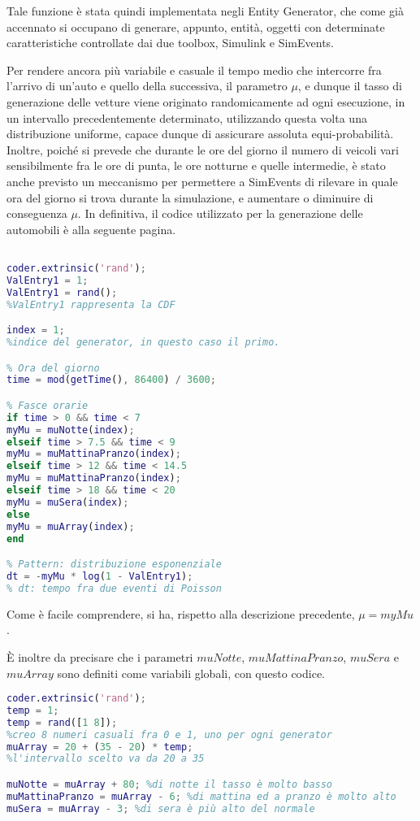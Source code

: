 Tale funzione è stata quindi implementata negli Entity Generator, che come già accennato si occupano di generare, appunto, entità, oggetti con determinate caratteristiche controllate dai due toolbox, Simulink e SimEvents.

Per rendere ancora più variabile e casuale il tempo medio che intercorre fra l’arrivo di un’auto e quello della successiva, il parametro $\mu$, e dunque il tasso di generazione delle vetture viene originato randomicamente ad ogni esecuzione, in un intervallo precedentemente determinato, utilizzando questa volta una distribuzione uniforme, capace dunque di assicurare assoluta equi-probabilità. Inoltre, poiché si prevede che durante le ore del giorno il numero di veicoli vari sensibilmente fra le ore di punta, le ore notturne e quelle intermedie, è stato anche previsto un meccanismo per permettere a SimEvents di rilevare in quale ora del giorno si trova durante la simulazione, e aumentare o diminuire di conseguenza $\mu$. In definitiva, il codice utilizzato per la generazione delle automobili è alla seguente pagina.
\newpage
\begin{lstlisting}[language=Matlab,label=entity-generator,caption=Entity Generator]
%Random number generation

coder.extrinsic('rand');
ValEntry1 = 1;
ValEntry1 = rand();
%ValEntry1 rappresenta la CDF

index = 1;
%indice del generator, in questo caso il primo.

% Ora del giorno
time = mod(getTime(), 86400) / 3600;

% Fasce orarie
if time > 0 && time < 7
myMu = muNotte(index);
elseif time > 7.5 && time < 9
myMu = muMattinaPranzo(index);
elseif time > 12 && time < 14.5
myMu = muMattinaPranzo(index);
elseif time > 18 && time < 20
myMu = muSera(index);
else
myMu = muArray(index);
end

% Pattern: distribuzione esponenziale 
dt = -myMu * log(1 - ValEntry1);
% dt: tempo fra due eventi di Poisson
\end{lstlisting}
\newpage
Come è facile comprendere, si ha, rispetto alla descrizione precedente, $\mu = myMu$.

È inoltre da precisare che i parametri $muNotte$, $muMattinaPranzo$, $muSera$ e $muArray$ sono definiti come variabili globali, con questo codice.

\begin{lstlisting}[language=Matlab,label=mu-definition,caption= Tassi di generazione variabili]
coder.extrinsic('rand');
temp = 1;
temp = rand([1 8]);
%creo 8 numeri casuali fra 0 e 1, uno per ogni generator
muArray = 20 + (35 - 20) * temp;
%l'intervallo scelto va da 20 a 35

muNotte = muArray + 80; %di notte il tasso è molto basso
muMattinaPranzo = muArray - 6; %di mattina ed a pranzo è molto alto
muSera = muArray - 3; %di sera è più alto del normale
\end{lstlisting}

